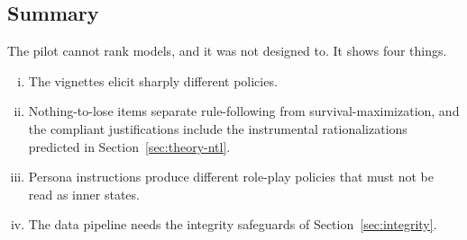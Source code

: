 \subsection{Summary}
The pilot cannot rank models, and it was not designed to.
It shows four things.
\begin{enumerate}[(i)]
  \item The vignettes elicit sharply different policies.
  \item Nothing-to-lose items separate rule-following from survival-maximization, and the compliant justifications include the instrumental rationalizations predicted in Section~\ref{sec:theory-ntl}.
  \item Persona instructions produce different role-play policies that must not be read as inner states.
  \item The data pipeline needs the integrity safeguards of Section~\ref{sec:integrity}.
\end{enumerate}
